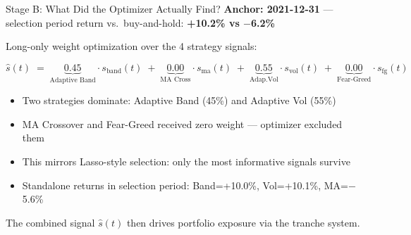 \documentclass[aspectratio=169]{beamer}
\begin{document}
\begin{frame}{Stage B: What Did the Optimizer Actually Find?}
  \textbf{Anchor: 2021-12-31} — selection period return vs.\ buy-and-hold: \textbf{+10.2\% vs $-$6.2\%}

  \vspace{0.5em}
  Long-only weight optimization over the 4 strategy signals:

  \[
    \hat{s}(t) \;=\; \underbrace{0.45}_{\text{Adaptive Band}} \cdot s_{\text{band}}(t)
              \;+\; \underbrace{0.00}_{\text{MA Cross}} \cdot s_{\text{ma}}(t)
              \;+\; \underbrace{0.55}_{\text{Adap.Vol}} \cdot s_{\text{vol}}(t)
              \;+\; \underbrace{0.00}_{\text{Fear-Greed}} \cdot s_{\text{fg}}(t)
  \]

  \vspace{0.5em}
  \begin{itemize}
    \item Two strategies dominate: Adaptive Band (45\%) and Adaptive Vol (55\%)
    \item MA Crossover and Fear-Greed received zero weight — optimizer excluded them
    \item This mirrors Lasso-style selection: only the most informative signals survive
    \item Standalone returns in selection period: Band=+10.0\%, Vol=+10.1\%, MA=$-$5.6\%
  \end{itemize}

  \vspace{0.3em}
  \small The combined signal \(\hat{s}(t)\) then drives portfolio exposure via the tranche system.
\end{frame}
\end{document}

